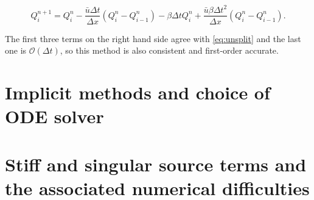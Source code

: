 \documentclass[journal,onecolumn]{IEEEtran}
\begin{document}
\begin{equation}
	Q_i^{n+1} = Q_i^n -\frac{\bar{u}\Delta t}{\Delta x}(Q_i^n-Q_{i-1}^n)-\beta\Delta tQ_i^n +\frac{\bar{u}\beta\Delta t^2}{\Delta x}(Q_i^n-Q_{i-1}^n).
\end{equation}

The first three terms on the right hand side agree with \eqref{eq:unsplit} and the last one is $\mathcal{O}(\Delta t)$, so this method is also consistent and first-order accurate.

























\section{Implicit methods and choice of ODE solver}

\section{Stiff and singular source terms and the associated numerical difficulties}



%
\end{document}
